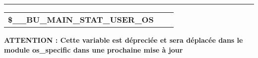 \documentclass[a4paper,10pt]{article}
\begin{document}

\par\noindent\rule{\textwidth}{0.4pt}

\begin{justify}
    \begin{tabular}{l|l|l}
        \textbf{\color{vars}\$\_\_BU\_MAIN\_STAT\_USER\_OS}   & &\\[1\baselineskip]
    \end{tabular}
\end{justify}

\begin{justify}
    \textbf{ATTENTION : Cette variable est dépreciée et sera déplacée dans le module \textbf{\color{lime}os\_specific} dans une prochaine mise à jour}
\end{justify}
\end{document}

